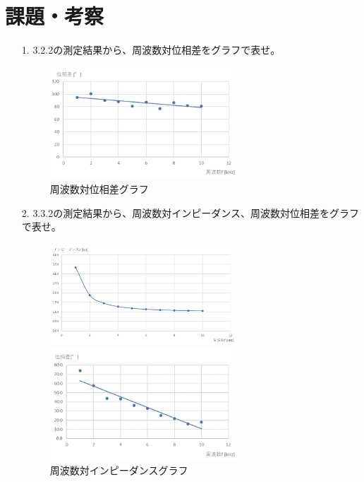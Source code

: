 \documentclass[uplatex]{jsarticle}
\begin{document}
	\section{課題・考察}
		\begin{enumerate}
			\item[1.]{3.2.2の測定結果から、周波数対位相差をグラフで表せ。}
				\begin{figure}[h]
					\begin{center}
						\includegraphics[width = 7cm]{RC直列回路と交流グラフ1.png}
					\end{center}
					\caption{周波数対位相差グラフ}
				\end{figure}
			\item[2.]{3.3.2の測定結果から、周波数対インピーダンス、周波数対位相差をグラフで表せ。}
				\begin{figure}[h]
					\begin{minipage}{0.5\hsize}
						\begin{center}
							\includegraphics[width = 7cm]{RC直列回路と交流グラフ2.png}
						\end{center}
						\caption{周波数対インピーダンスグラフ}
					\end{minipage}
					\begin{minipage}{0.5\hsize}
						\begin{center}
							\includegraphics[width = 7cm]{RC直列回路と交流グラフ3.png}

\end{center}
\end{minipage}
\end{figure}
\end{enumerate}
\end{document}
